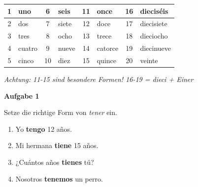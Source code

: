 \documentclass[11pt, a4paper]{article}
\newcommand{\fachfarbe}{spanisch}
\newcommand{\punktebox}[1]{\hfill\fbox{\small \_/#1}}
\newcommand{\loesung}[1]{\textcolor{loesung}{\textbf{#1}}}
\newenvironment{aufgabe}[1]{%
    \needspace{5\baselineskip}%
    \nopagebreak[4]%
    \vspace{10pt}
    \noindent\textbf{\textcolor{\fachfarbe}{Aufgabe #1}}
    \nopagebreak[4]%
    \vspace{5pt}
    \nopagebreak[4]%
    \begin{list}{}{\leftmargin=0pt}
    \item[]
}{%
    \end{list}
}
\begin{document}

\begin{merkkasten}

\begin{center}
\begin{tabular}{|c|l|c|l|c|l|c|l|}
\hline
1 & uno & 6 & seis & 11 & once & 16 & dieciséis \\
\hline
2 & dos & 7 & siete & 12 & doce & 17 & diecisiete \\
\hline
3 & tres & 8 & ocho & 13 & trece & 18 & dieciocho \\
\hline
4 & cuatro & 9 & nueve & 14 & catorce & 19 & diecinueve \\
\hline
5 & cinco & 10 & diez & 15 & quince & 20 & veinte \\
\hline
\end{tabular}
\end{center}

\vspace{0.3em}
\textit{Achtung: 11-15 sind besondere Formen! 16-19 = dieci + Einer}
\end{merkkasten}

\vspace{15pt}


\begin{aufgabe}{1}
Setze die richtige Form von \textit{tener} ein. \punktebox{4}
\end{aufgabe}

\begin{enumerate}[label=\alph*)]
    \item Yo \loesung{tengo} 12 años.
    \item Mi hermana \loesung{tiene} 15 años.
    \item ¿Cuántos años \loesung{tienes} tú?
    \item Nosotros \loesung{tenemos} un perro.
\end{enumerate}

\vspace{15pt}

\end{document}
